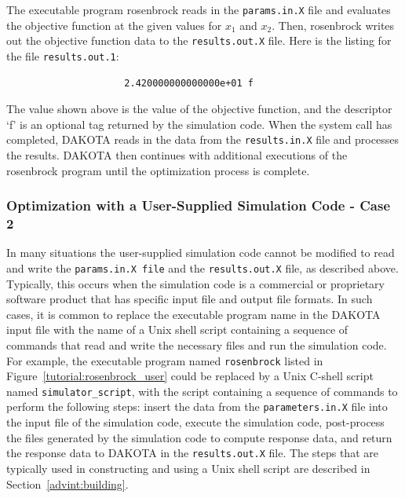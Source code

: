 The executable program rosenbrock reads in the \texttt{params.in.X}
file and evaluates the objective function at the given values for
$x_1$ and $x_2$.  Then, rosenbrock writes out
the objective function data to the \texttt{results.out.X} file. Here
is the listing for the file \texttt{results.out.1}:
\begin{small}
\begin{verbatim}
                     2.420000000000000e+01 f
\end{verbatim}
\end{small}

The value shown above is the value of the objective function, and the
descriptor `f' is an optional tag returned by the simulation code.
When the system call has completed, DAKOTA reads in the data from the
\texttt{results.in.X} file and processes the results. DAKOTA then
continues with additional executions of the rosenbrock program until
the optimization process is complete.

\subsubsection{Optimization with a User-Supplied Simulation Code - Case 2}\label{tutorial:example:user_supply:optimization2}

In many situations the user-supplied simulation code cannot be
modified to read and write the \texttt{params.in.X file} and the
\texttt{results.out.X} file, as described above. Typically, this
occurs when the simulation code is a commercial or proprietary
software product that has specific input file and output file formats.
In such cases, it is common to replace the executable program name in
the DAKOTA input file with the name of a Unix shell script containing
a sequence of commands that read and write the necessary files and run
the simulation code. For example, the executable program named
\texttt{rosenbrock} listed in Figure~\ref{tutorial:rosenbrock_user}
could be replaced by a Unix C-shell script named
\texttt{simulator\_script}, with the script containing a sequence of
commands to perform the following steps: insert the data from the
\texttt{parameters.in.X} file into the input file of the simulation
code, execute the simulation code, post-process the files generated by
the simulation code to compute response data, and return the response
data to DAKOTA in the \texttt{results.out.X} file. The steps that are
typically used in constructing and using a Unix shell script are
described in Section~\ref{advint:building}.

